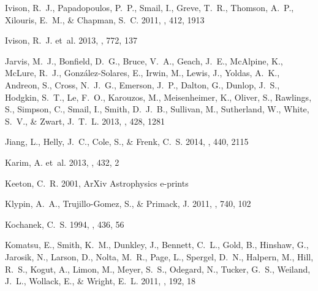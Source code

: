 \documentclass[iop]{emulateapj}
\begin{document}
\begin{thebibliography}{107}
{Ivison}, R.~J., {Papadopoulos}, P.~P., {Smail}, I., {Greve}, T.~R., {Thomson},
  A.~P., {Xilouris}, E.~M., \& {Chapman}, S.~C. 2011, \mnras, 412, 1913

{Ivison}, R.~J. {et~al.} 2013, \apj, 772, 137

{Jarvis}, M.~J., {Bonfield}, D.~G., {Bruce}, V.~A., {Geach}, J.~E., {McAlpine},
  K., {McLure}, R.~J., {Gonz{\'a}lez-Solares}, E., {Irwin}, M., {Lewis}, J.,
  {Yoldas}, A.~K., {Andreon}, S., {Cross}, N.~J.~G., {Emerson}, J.~P.,
  {Dalton}, G., {Dunlop}, J.~S., {Hodgkin}, S.~T., {Le}, F.~O., {Karouzos}, M.,
  {Meisenheimer}, K., {Oliver}, S., {Rawlings}, S., {Simpson}, C., {Smail}, I.,
  {Smith}, D.~J.~B., {Sullivan}, M., {Sutherland}, W., {White}, S.~V., \&
  {Zwart}, J.~T.~L. 2013, \mnras, 428, 1281

{Jiang}, L., {Helly}, J.~C., {Cole}, S., \& {Frenk}, C.~S. 2014, \mnras, 440,
  2115

{Karim}, A. {et~al.} 2013, \mnras, 432, 2

{Keeton}, C.~R. 2001, ArXiv Astrophysics e-prints

{Klypin}, A.~A., {Trujillo-Gomez}, S., \& {Primack}, J. 2011, \apj, 740, 102

{Kochanek}, C.~S. 1994, \apj, 436, 56

{Komatsu}, E., {Smith}, K.~M., {Dunkley}, J., {Bennett}, C.~L., {Gold}, B.,
  {Hinshaw}, G., {Jarosik}, N., {Larson}, D., {Nolta}, M.~R., {Page}, L.,
  {Spergel}, D.~N., {Halpern}, M., {Hill}, R.~S., {Kogut}, A., {Limon}, M.,
  {Meyer}, S.~S., {Odegard}, N., {Tucker}, G.~S., {Weiland}, J.~L., {Wollack},
  E., \& {Wright}, E.~L. 2011, \apjs, 192, 18


\end{thebibliography}
\end{document}
